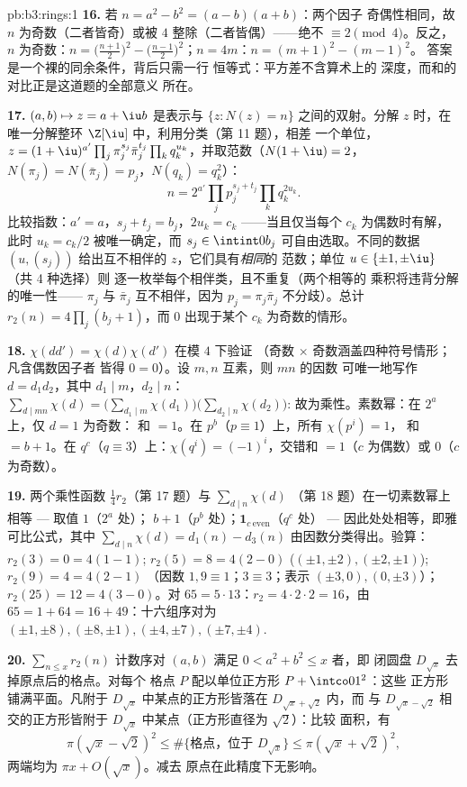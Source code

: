 \begin{solution}{pb:b3:rings:1}
\textbf{16.} 若 $n = a^2 - b^2 = (a-b)(a+b)$：两个因子
奇偶性相同，故 $n$ 为奇数（二者皆奇）或被
$4$ 整除（二者皆偶）——绝不 $\equiv 2 \pmod 4$。反之，$n$
为奇数：$n = \bigl(\frac{n+1}2\bigr)^2 -
\bigl(\frac{n-1}2\bigr)^2$；$n = 4m$：$n = (m+1)^2 - (m-1)^2$。
答案是一个裸的同余条件，背后只需一行
恒等式：平方差不含算术上的
深度，而和的对比正是这道题的全部意义
所在。

\textbf{17.} $(a, b) \mapsto z = a + \iu b$ 是表示与
$\{z : N(z) = n\}$ 之间的双射。分解 $z$ 时，在
唯一分解整环 $\Z[\iu]$ 中，利用分类（第 11 题），相差
一个单位，$z = (1+\iu)^{a'}\prod_j\pi_j^{s_j}\bar\pi_j^{t_j}
\prod_kq_k^{u_k}$，并取范数（$N(1+\iu) = 2$，
$N(\pi_j) = N(\bar\pi_j) = p_j$，$N(q_k) = q_k^2$）：
\[
n = 2^{a'}\prod_jp_j^{s_j + t_j}\prod_kq_k^{2u_k} .
\]
比较指数：$a' = a$，$s_j + t_j = b_j$，$2u_k = c_k$
——当且仅当每个 $c_k$ 为偶数时有解，此时 $u_k = c_k/2$
被唯一确定，而 $s_j \in \intint0{b_j}$ 可自由选取。不同的数据
$(u, (s_j))$ 给出互不相伴的 $z$，它们具有\emph{相同}的
范数；单位 $u \in \{\pm1, \pm\iu\}$（共 4 种选择）则
逐一枚举每个相伴类，且不重复（两个相等的
乘积将违背分解的唯一性——
$\pi_j$ 与 $\bar\pi_j$ 互不相伴，因为 $p_j =
\pi_j\bar\pi_j$ 不分歧）。总计 $r_2(n) =
4\prod_j(b_j + 1)$，而 $0$ 出现于某个 $c_k$ 为奇数的情形。

\textbf{18.} $\chi(dd') = \chi(d)\chi(d')$ 在模 $4$ 下验证
（奇数 $\times$ 奇数涵盖四种符号情形；凡含偶数因子者
皆得 $0 = 0$）。设 $m, n$ 互素，则 $mn$ 的因数
可唯一地写作 $d = d_1d_2$，其中 $d_1 \mid m$，$d_2 \mid n$：
$\sum_{d \mid mn}\chi(d) = \bigl(\sum_{d_1\mid
m}\chi(d_1)\bigr)\bigl(\sum_{d_2\mid n}\chi(d_2)\bigr)$:
故为乘性。素数幂：在 $2^a$ 上，仅 $d = 1$ 为奇数：
和 $= 1$。在 $p^b$（$p \equiv 1$）上，所有 $\chi(p^i) = 1$，
和 $= b + 1$。在 $q^c$（$q \equiv 3$）上：$\chi(q^i) =
(-1)^i$，交错和 $= 1$（$c$ 为偶数）或 $0$（$c$ 为奇数）。

\textbf{19.} 两个乘性函数
$\frac14r_2$（第 17 题）与 $\sum_{d\mid n}\chi(d)$
（第 18 题）在一切素数幂上相等 --- 取值 $1$（$2^a$ 处）；
$b + 1$（$p^b$ 处）；$\mathbf 1_{c\ \mathrm{even}}$（$q^c$ 处） ---
因此处处相等，即雅可比公式，其中 $\sum_{d\mid
n}\chi(d) = d_1(n) - d_3(n)$ 由因数分类得出。验算：
$r_2(3) = 0 = 4(1 - 1)$; $r_2(5) = 8 = 4(2 - 0)$
($(\pm1,\pm2), (\pm2,\pm1)$); $r_2(9) = 4 = 4(2 - 1)$
（因数 $1, 9 \equiv 1$；$3 \equiv 3$；表示
$(\pm3, 0), (0, \pm3)$）；$r_2(25) = 12 = 4(3 - 0)$。对 $65 =
5\cdot13$：$r_2 = 4\cdot2\cdot2 = 16$，由 $65 = 1 + 64 = 16
+ 49$：十六组序对为 $(\pm1, \pm8), (\pm8, \pm1), (\pm4,
\pm7), (\pm7, \pm4)$.

\textbf{20.} $\sum_{n \leq x}r_2(n)$ 计数序对 $(a, b)$
满足 $0 < a^2 + b^2 \leq x$ 者，即
闭圆盘 $D_{\sqrt x}$ 去掉原点后的格点。对每个
格点 $P$ 配以单位正方形 $P + \intco01^2$：这些
正方形铺满平面。凡附于
$D_{\sqrt x}$ 中某点的正方形皆落在 $D_{\sqrt x + \sqrt2}$ 内，而
与 $D_{\sqrt x - \sqrt 2}$ 相交的正方形皆附于
$D_{\sqrt x}$ 中某点（正方形直径为 $\sqrt 2$）：比较
面积，有
\[
\pi(\sqrt x - \sqrt2)^2 \leq \#\{\text{格点，位于 }
D_{\sqrt x}\} \leq \pi(\sqrt x + \sqrt 2)^2,
\]
两端均为 $\pi x + O(\sqrt x)$。减去
原点在此精度下无影响。


\end{solution}
